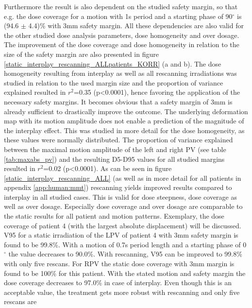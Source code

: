 Furthermore the result is also dependent on the studied safety margin, so that e.g. the dose coverage for a motion with 1s period 
and a starting phase of 90$^{\circ}$ is (94.6 $\pm$ 4.4)\% with 3mm safety margin. All these dependencies are also valid for 
the other studied dose analysis parameters, dose homogeneity and over dosage. The improvement of the dose coverage and dose homogeneity 
in relation to the size of the safety margin are also presented in figure \ref{static_interplay_rescanning_ALLpatients_KORR} (a and b). 
The dose homogeneity resulting from interplay as well as all rescanning irradiations was studied in relation to the used margin size and the 
proportion of variance explained resulted in $r^{2}$=0.35 (p<0.0001), hence favoring the application of the necessary safety margins. 
It becomes obvious that a safety margin of 3mm is already sufficient to drastically improve the outcome.\newline 
\newline
The underlying deformation map with its motion amplitude does not enable a prediction of the magnitude of the interplay effect. 
This was studied in more detail for the dose homogeneity, as these values were normally distributed. 
The proportion of variance explained between the maximal motion amplitude of the left and right PV (see table \ref{tab:maxabs_pv}) and 
the resulting D5-D95 values for all studied margins resulted in $r^{2}$=0.02 (p<0.0001).\newline 
\newline
As can be seen in figure \ref{static_interplay_rescanning_ALL} (as well as in more detail for all patients in appendix \ref{app:human:mmt}) 
rescanning yields improved results compared to interplay in all studied cases. This is valid for dose steepness, dose 
coverage as well as over dosage. Especially dose coverage and over dosage are comparable to the static results for all patient and motion patterns.  
Exemplary, the dose coverage of patient 4 (with the largest absolute displacement) will be discussed. V95 for a static irradiation of the 
LPV of patient 4 with 3mm safety margin is found to be 99.8\%. With a motion of 0.7s period length and a starting phase of 0$^{\circ}$ the value  
decreases to 90.0\%. With rescanning, V95 can be improved to 99.8\% with only five rescans. For RPV the static dose coverage 
with 3mm margin is found to be 100\% for this patient. With the stated motion and safety margin the dose coverage decreases to 97.0\%  
in case of interplay. Even though this is an acceptable value, the treatment gets more robust with rescanning and only five rescans are 
